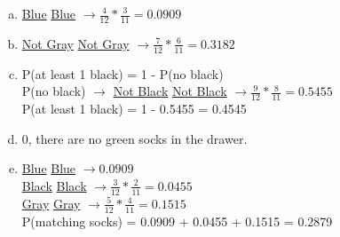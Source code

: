 {
\begin{enumerate}[(a)]
\item \underline{Blue} \underline{Blue} $\rightarrow \frac{4}{12} * \frac{3}{11} = 0.0909$
\item \underline{Not Gray} \underline{Not Gray} $\rightarrow \frac{7}{12} * \frac{6}{11} = 0.3182$
\item P(at least 1 black) = 1 - P(no black) \\
P(no black) $\rightarrow$  \underline{Not Black} \underline{Not Black} $\rightarrow \frac{9}{12} * \frac{8}{11} = 0.5455$ \\
P(at least 1 black) = 1 - 0.5455 = 0.4545
\item 0, there are no green socks in the drawer.
\item \underline{Blue} \underline{Blue} $\rightarrow 0.0909$ \\
\underline{Black} \underline{Black} $\rightarrow \frac{3}{12} * \frac{2}{11} = 0.0455$ \\
\underline{Gray} \underline{Gray} $\rightarrow \frac{5}{12} * \frac{4}{11} = 0.1515$ \\
P(matching socks) = 0.0909 + 0.0455 + 0.1515 = 0.2879
\end{enumerate}
}

%

